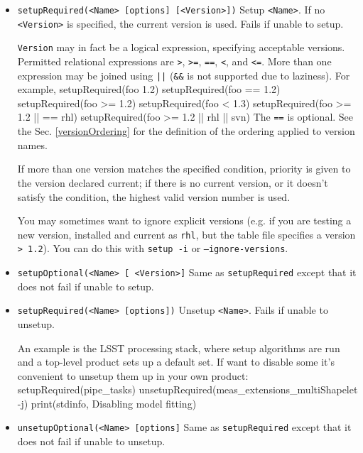 \documentclass{article}
\newcommand{\code}[1]{\texttt{#1}}
\let\overbatim=\verbatim
\let\oendverbatim=\endverbatim
\renewenvironment{verbatim}
{\center\minipage{16cm}\overbatim}
{\oendverbatim\endminipage\endcenter}
\begin{document}
\begin{itemize}
   \item \code{setupRequired(<Name> [options] [<Version>])}
     Setup \code{<Name>}.  If no \code{<Version>} is specified, the current
     version is used. Fails if unable to setup.

     \code{Version} may in fact be a logical expression, specifying acceptable
     versions. Permitted relational expressions are \code{>}, \code{>=}, \code{==},
     \code{<}, and \code{<=}. More than one expression may be joined using \code{||}
     (\code{\&\&} is not supported due to laziness).  For example,
\begin{verbatim}
    setupRequired(foo 1.2)
    setupRequired(foo == 1.2)
    setupRequired(foo >= 1.2)
    setupRequired(foo < 1.3)
    setupRequired(foo >= 1.2 || == rhl)
    setupRequired(foo >= 1.2 || rhl || svn)
\end{verbatim}
    The \code{==} is optional.  See the Sec. \ref{versionOrdering} for the definition
    of the ordering applied to version names.

    If more than one version matches the specified condition, priority is
    given to the version declared current;  if there is no current
    version, or it doesn't satisfy the condition, the highest valid version number
    is used.

    You may sometimes want to ignore explicit versions (e.g. if you are testing
    a new version, installed and current as \code{rhl}, but the table file specifies a
    version \code{> 1.2}).  You can do this with \code{setup -i} or \code{--ignore-versions}.

   \item \code{setupOptional(<Name> [ <Version>]}
     Same as \code{setupRequired} except that it does not fail if unable to setup.

   \item \code{setupRequired(<Name> [options])}
     Unsetup \code{<Name>}.  Fails if unable to unsetup.

     An example is the LSST processing stack, where setup algorithms are run and a top-level
     product sets up a default set.  If want to disable some it's convenient to unsetup them up
     in your own product:
\begin{verbatim}
setupRequired(pipe_tasks)
unsetupRequired(meas_extensions_multiShapelet -j)
print(stdinfo, Disabling model fitting)
\end{verbatim}

   \item \code{unsetupOptional(<Name> [options]}
     Same as \code{setupRequired} except that it does not fail if unable to unsetup.


\end{itemize}
\end{document}

